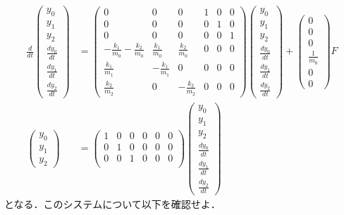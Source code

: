 \documentclass[a4paper,11pt]{jreport}
\begin{document}
\begin{align}
 \frac{d}{dt} \left(\begin{array}{c}
	         y_0 \\
		     y_1 \\
		     y_2 \\
		     \frac{dy_0}{dt} \\
		     \frac{dy_1}{dt} \\
		     \frac{dy_2}{dt}
		    \end{array}\right)
 &=
 \left(\begin{array}{cccccc}
        0 & 0 & 0 & 1 & 0 & 0      \\
        0 & 0 & 0 & 0 & 1 & 0      \\
        0 & 0 & 0 & 0 & 0 & 1      \\
	-\frac{k_1}{m_0} -\frac{k_2}{m_0}&  \frac{k_1}{m_0} &  \frac{k_2}{m_0} & 0 & 0 & 0 \\
	 \frac{k_1}{m_1}                & -\frac{k_1}{m_1} &  0               & 0 & 0 & 0 \\
	 \frac{k_2}{m_2}                &  0               & -\frac{k_2}{m_2} & 0 & 0 & 0 
       \end{array}\right)
 \left(\begin{array}{c}
	         y_0 \\
		     y_1 \\
		     y_2 \\
		     \frac{dy_0}{dt} \\
		     \frac{dy_1}{dt} \\
		     \frac{dy_2}{dt}
       \end{array}\right)
 +
 \left(\begin{array}{c}
        0 \\
        0 \\
        0 \\
	    \frac{1}{m_0} \\
	    0 \\
	    0 
       \end{array}\right)
        F
\nonumber
\\
 \left(\begin{array}{c}
	    y_0 \\
		y_1 \\
		y_2
       \end{array}\right)
 &=
 \left(\begin{array}{cccccc}
         1 & 0 & 0 & 0 & 0 & 0  \\
         0 & 1 & 0 & 0 & 0 & 0 \\
         0 & 0 & 1 & 0 & 0 & 0 \\
       \end{array}\right)
 \left(\begin{array}{c}
	         y_0 \\
		     y_1 \\
		     y_2 \\
		     \frac{dy_0}{dt} \\
		     \frac{dy_1}{dt} \\
		     \frac{dy_2}{dt}
       \end{array}\right)
\nonumber
\end{align}
となる．このシステムについて以下を確認せよ．
\end{document}
